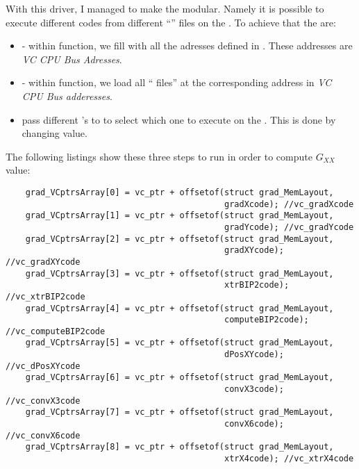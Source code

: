 With this driver, I managed to make the \api{} modular. Namely it is possible to execute different codes from different \enquote{} files on the \vc.
To achieve that the  are:

\begin{itemize}
	\item {} - within  function, we fill  with all the adresses defined in . These addresses are \emph{VC CPU Bus Adresses}.
	\item {} - within  function, we load all \enquote{ files} at the corresponding address in \emph{VC CPU Bus adderesses}.
	\item pass different 's  to  to select which one to execute on the \vc. This is done by changing  value.
\end{itemize}

\newpage
The following listings show these three steps to run  in order to compute $G_{XX}$ value:

\begin{lstlisting}
    grad_VCptrsArray[0] = vc_ptr + offsetof(struct grad_MemLayout,
                                            gradXcode); //vc_gradXcode
    grad_VCptrsArray[1] = vc_ptr + offsetof(struct grad_MemLayout,
                                            gradYcode); //vc_gradYcode
    grad_VCptrsArray[2] = vc_ptr + offsetof(struct grad_MemLayout,
                                            gradXYcode); //vc_gradXYcode
    grad_VCptrsArray[3] = vc_ptr + offsetof(struct grad_MemLayout,
                                            xtrBIP2code); //vc_xtrBIP2code
    grad_VCptrsArray[4] = vc_ptr + offsetof(struct grad_MemLayout,
                                            computeBIP2code); //vc_computeBIP2code
    grad_VCptrsArray[5] = vc_ptr + offsetof(struct grad_MemLayout,
                                            dPosXYcode); //vc_dPosXYcode
    grad_VCptrsArray[6] = vc_ptr + offsetof(struct grad_MemLayout,
                                            convX3code); //vc_convX3code
    grad_VCptrsArray[7] = vc_ptr + offsetof(struct grad_MemLayout,
                                            convX6code); //vc_convX6code
    grad_VCptrsArray[8] = vc_ptr + offsetof(struct grad_MemLayout,
                                            xtrX4code); //vc_xtrX4code
\end{lstlisting}


